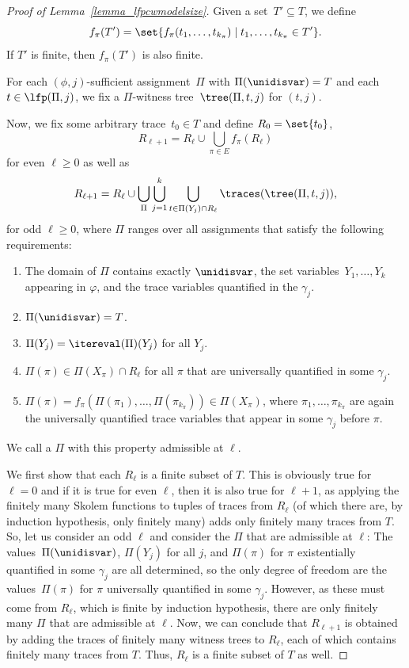 \begin{proof}[Proof of Lemma~\ref{lemma_lfpcwmodelsize}]
Given a set~$T' \subseteq T$, we define 
\[f_{\pi}(T') = \set{f_\pi(t_1, \ldots, t_{k_{\pi}}) \mid t_1, \ldots, t_{k_\pi} \in T' }.\]
If $T'$ is finite, then $f_{\pi}(T')$ is also finite. 

For each $(\phi,j)$-sufficient assignment~$\Pi$ with $\Pi(\unidisvar) = T$ and each $t \in \lfp(\Pi,j)$, we fix a $\Pi$-witness tree~$\tree(\Pi, t, j)$ for $(t,j)$. 

Now, we fix some arbitrary trace~$t_0 \in T$ and define $R_0 = \set{t_0}$,
\[
R_{\ell+1} = R_\ell \cup 
\bigcup_{\pi \in E} f_\pi(R_\ell) 
\]
for even $\ell \ge 0$ as well as
\[
R_{\ell+1} = R_\ell \cup \bigcup_{\Pi}\bigcup_{j=1}^k \bigcup_{t \in \Pi(Y_j) \cap R_\ell} \traces(\tree(\Pi, t, j)),
\]
for odd $\ell \ge 0$, where $\Pi$ ranges over all assignments that satisfy the following requirements:
\begin{enumerate}
    \item\label{admiss:domain} The domain of $\Pi$ contains exactly $\unidisvar$, the set variables~$ Y_1, \ldots, Y_k$ appearing in $\varphi$, and the trace variables quantified in the $\gamma_j$.
    \item\label{admiss:disc} $\Pi(\unidisvar) = T$.
    \item\label{admiss:set} $\Pi(Y_j) = \itereval(\Pi)(Y_j)$ for all $Y_j$.
    \item\label{admiss:univ} $\Pi(\pi) \in \Pi(X_\pi) \cap R_\ell$ for all $\pi$ that are universally quantified in some $\gamma_j$. 
    \item\label{admiss:ex} $\Pi(\pi) = f_\pi(\Pi(\pi_1), \ldots, \Pi(\pi_{k_\pi})) \in \Pi(X_\pi)$, where $\pi_1, \ldots, \pi_{k_\pi}$ are again the universally quantified trace variables that appear in some $\gamma_j$ before $\pi$.    
\end{enumerate}
We call a $\Pi$ with this property admissible at $\ell$.

We first show that each $R_\ell$ is a finite subset of $T$. This is obviously true for $\ell = 0$ and if it is true for even $\ell$, then it is also true for $\ell+1$, as applying the finitely many Skolem functions to tuples of traces from $R_\ell$ (of which there are, by induction hypothesis, only finitely many) adds only finitely many traces from $T$. 
So, let us consider an odd $\ell$ and consider the $\Pi$ that are admissible at $\ell$: The values~$\Pi(\unidisvar)$, $\Pi(Y_j)$ for all $j$, and $\Pi(\pi)$ for $\pi$ existentially quantified in some $\gamma_j$ are all determined, so the only degree of freedom are the values~$\Pi(\pi)$ for $\pi$ universally quantified in some $\gamma_j$.
However, as these must come from $R_\ell$, which is finite by induction hypothesis, there are only finitely many $\Pi$ that are admissible at $\ell$. Now, we can conclude that $R_{\ell+1}$ is obtained by adding the traces of finitely many witness trees to $R_\ell$, each of which contains finitely many traces from $T$. Thus, $R_\ell$ is a finite subset of $T$ as well.


\end{proof}
